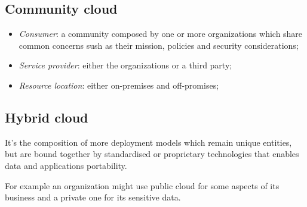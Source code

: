 \subsection{Community cloud}
\begin{itemize}
    \item \emph{Consumer}: a community composed by one or more organizations
    which share common concerns sush as their mission, policies and security
    considerations;
    \item \emph{Service provider}: either the organizations or a third party;
    \item \emph{Resource location}: either on-premises and off-promises;
\end{itemize}

\subsection{Hybrid cloud}
It's the composition of more deployment models which remain unique
entities, but are bound together by standardised or proprietary technologies
that enables data and applications portability.

For example an organization might use public cloud for some aspects of its
business and a private one for its sensitive data.